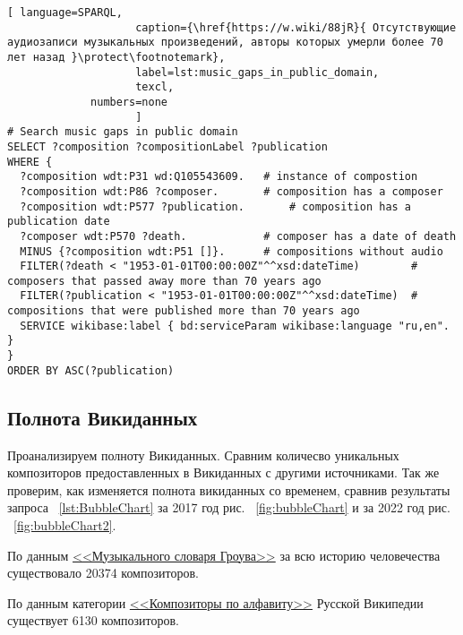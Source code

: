 \begin{lstlisting}[ language=SPARQL,
                    caption={\href{https://w.wiki/88jR}{ Отсутствующие аудиозаписи музыкальных произведений, авторы которых умерли более 70 лет назад }\protect\footnotemark},
                    label=lst:music_gaps_in_public_domain,
                    texcl,
	         numbers=none
                    ]
# Search music gaps in public domain
SELECT ?composition ?compositionLabel ?publication
WHERE {
  ?composition wdt:P31 wd:Q105543609.	# instance of compostion
  ?composition wdt:P86 ?composer.		# composition has a composer
  ?composition wdt:P577 ?publication.		# composition has a publication date
  ?composer wdt:P570 ?death.			# composer has a date of death
  MINUS {?composition wdt:P51 []}.		# compositions without audio 
  FILTER(?death < "1953-01-01T00:00:00Z"^^xsd:dateTime)        # composers that passed away more than 70 years ago
  FILTER(?publication < "1953-01-01T00:00:00Z"^^xsd:dateTime)  # compositions that were published more than 70 years ago
  SERVICE wikibase:label { bd:serviceParam wikibase:language "ru,en". }
}
ORDER BY ASC(?publication)
\end{lstlisting}%


\subsection{Полнота Викиданных}
Проанализируем полноту Викиданных. Сравним количесво уникальных композиторов предоставленных в Викиданных с другими источниками. Так же проверим, как изменяется полнота викиданных со временем, сравнив результаты запроса ~\ref{lst:BubbleChart} за 2017 год рис. ~\ref{fig:bubbleChart} и за 2022 год рис. ~\ref{fig:bubbleChart2}.

По данным \href{https://ru.wikipedia.org/wiki/Музыкальный_словарь_Гроува}{<<Музыкального словаря Гроува>>} за всю историю человечества существовало \num{20374} композиторов.


По данным категории \href{https://ru.wikipedia.org/wiki/Категория:Композиторы_по_алфавиту}{<<Композиторы по алфавиту>>} Русской Википедии существует \num{6130} композиторов.


